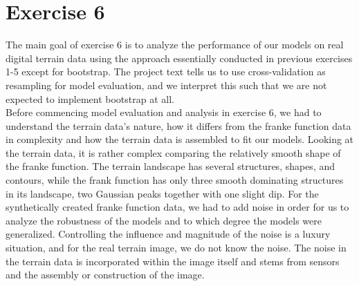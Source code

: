 \documentclass[11pt, a4paper]{article}
\begin{document}
\section*{Exercise 6}
The main goal of exercise 6 is to analyze the performance of our models on real digital terrain data using the approach essentially conducted in previous exercises
1-5 except for bootstrap. The project text tells us to use cross-validation as resampling for model evaluation, and we interpret this such that we are not expected
to implement bootstrap at all. \\
Before commencing model evaluation and analysis in exercise 6, we had to understand the terrain data's nature, how it differs from the franke function data in 
complexity and how the terrain data is assembled to fit our models. Looking at the terrain data, it is rather complex comparing the relatively smooth shape of the 
franke function. The terrain landscape has several structures, shapes, and contours, while the frank function has only three smooth dominating structures in its landscape,
two Gaussian peaks together with one slight dip. For the synthetically created franke function data, we had to add noise in order for us to analyze the robustness of 
the models and to which degree the models were generalized. Controlling the influence and magnitude of the noise is a luxury situation, and for the real terrain image,
we do not know the noise. The noise in the terrain data is incorporated within the image itself and stems from sensors and the assembly or construction of the image.
\end{document}
